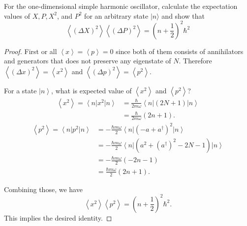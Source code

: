\begin{problem}
	
For the one-dimensional simple harmonic oscillator, calculate the expectation values of $X, P, X^2$, and $P^2$ for an arbitrary state $|n\rangle$ and show that
\[
\left\langle(\Delta X)^2\right\rangle\left\langle(\Delta P)^2\right\rangle=\left(n+\frac{1}{2}\right)^2 \hbar^2
\]
\end{problem}
\begin{proof}
	First or all $\left\langle x \right\rangle  = \left\langle p \right\rangle = 0$ since both of them consists of annihilators and generators that does not preserve any eigenstate of $N$. 
	Therefore $\left\langle (\Delta x)^2 \right\rangle  = \left\langle x^2 \right\rangle  $ 
	and $\left\langle \left( \Delta p \right) ^2 \right\rangle  = \left\langle p^2 \right\rangle $.

For a state $\left| n \right\rangle $, what is expected value of $\left\langle x^2 \right\rangle $ and $\left\langle p^2 \right\rangle $? 
\begin{align*}
	\left\langle x^2 \right\rangle = \left\langle n \right| x^2 \left| n \right\rangle 
	&= \frac{\hbar}{2 m \omega} \left\langle n \right| (2N+1) \left| n \right\rangle  \\
	&= \frac{\hbar }{2 m \omega} (2 n + 1)
.\end{align*}
\begin{align*}
	\left\langle p^2 \right\rangle = \left\langle n \right| p^2 \left| n \right\rangle 
	&= - \frac{\hbar m \omega}{2} \left\langle n \right| \left(- a + a^{\dag}\right)^2 \left| n \right\rangle \\
	&= - \frac{\hbar m \omega}{2}\left\langle n \right|  \left(a^2 + \left(a^{\dag}\right)^2 - 2N - 1\right)\left| n \right\rangle  \\
	&= - \frac{\hbar m \omega}{2} (- 2 n - 1) \\
	&= \frac{\hbar m \omega}{2} (2 n + 1) 
.\end{align*}

Combining those, we have
\[
	\left\langle x^2 \right\rangle \left\langle p^2 \right\rangle 
	= \left( n + \frac{1}{2} \right) ^2 \hbar^2
.\] 
This implies the desired identity.
\end{proof}


